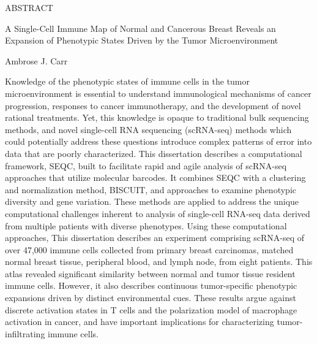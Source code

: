 
\pagestyle{empty} %
\begin{center}
  ABSTRACT

  A Single-Cell Immune Map of Normal and Cancerous Breast Reveals an Expansion of Phenotypic States Driven by the Tumor Microenvironment

  Ambrose J. Carr
\end{center}

Knowledge of the phenotypic states of immune cells in the tumor microenvironment is essential to understand immunological mechanisms of cancer progression, responses to cancer immunotherapy, and the development of novel rational treatments.
Yet, this knowledge is opaque to traditional bulk sequencing methods, and novel single-cell RNA sequencing (scRNA-seq) methods which could potentially address these questions introduce complex patterns of error into data that are poorly characterized. 
This dissertation describes a computational framework, SEQC, built to facilitate rapid and agile analysis of scRNA-seq approaches that utilize molecular barcodes.
It combines SEQC with a clustering and normalization method, BISCUIT, and approaches to examine phenotypic diversity and gene variation. 
These methods are applied to address the unique computational challenges inherent to analysis of single-cell RNA-seq data derived from multiple patients with diverse phenotypes. 
Using these computational approaches, This dissertation describes an experiment comprising scRNA-seq of over 47,000 immune cells collected from primary breast carcinomas, matched normal breast tissue, peripheral blood, and lymph node, from eight patients.  
This atlas revealed significant similarity between normal and tumor tissue resident immune cells.
However, it also describes continuous tumor-specific phenotypic expansions driven by distinct environmental cues.
These results argue against discrete activation states in T cells and the polarization model of macrophage activation in cancer, and have important implications for characterizing tumor-infiltrating immune cells.
